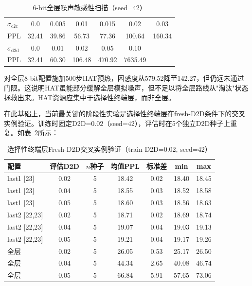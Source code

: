 \begin{table}[htbp]
\centering
\caption{6-bit全层噪声敏感性扫描（seed=42）}
\label{tab:work2_alllayer_sweep}
\begin{tabular}{lcccccc}
\toprule
$\sigma_{\text{c2c}}$ & 0.0 & 0.005 & 0.01 & 0.015 & 0.02 & 0.03 \\
PPL & 32.41 & 39.86 & 56.73 & 77.36 & 100.64 & 160.34 \\
\midrule
$\sigma_{\text{d2d}}$ & 0.0 & 0.01 & 0.02 & 0.05 & 0.10 & \\
PPL & 32.41 & 60.30 & 106.48 & 470.92 & 7635.49 & \\
\bottomrule
\end{tabular}
\end{table}

对全层8-bit配置施加500步HAT预热，困惑度从579.52降至142.27，但仍远未通过门限。这说明HAT虽能部分缓解全层模拟噪声，但不足以将全层路线从"淘汰"状态拯救出来。HAT资源应集中于选择性终端层，而非全层。

在此基础上，当前最关键的阶段性实验是选择性终端层在fresh-D2D条件下的交叉实例验证。训练时固定D2D=0.02（seed=42），评估时在5个独立D2D种子上重复。如表~\ref{tab:work2_fresh_d2d}所示：

\begin{table}[htbp]
\centering
\caption{选择性终端层Fresh-D2D交叉实例验证（train D2D=0.02, seed=42）}
\label{tab:work2_fresh_d2d}
\begin{tabular}{lcccccc}
\toprule
配置 & 评估D2D & $n$种子 & 均值PPL & 标准差 & min & max \\
\midrule
last1 [23] & 0.02 & 5 & 18.42 & 0.02 & 18.40 & 18.45 \\
last1 [23] & 0.04 & 5 & 18.55 & 0.03 & 18.52 & 18.58 \\
last1 [23] & 0.05 & 5 & 18.60 & 0.03 & 18.56 & 18.63 \\
\midrule
last2 [22,23] & 0.02 & 5 & 18.71 & 0.02 & 18.69 & 18.74 \\
last2 [22,23] & 0.04 & 5 & 19.07 & 0.04 & 19.03 & 19.13 \\
last2 [22,23] & 0.05 & 5 & 19.21 & 0.04 & 19.17 & 19.26 \\
\midrule
全层 & 0.02 & 5 & 26.05 & 0.53 & 25.17 & 26.50 \\
全层 & 0.04 & 5 & 44.34 & 2.65 & 40.08 & 46.74 \\
全层 & 0.05 & 5 & 66.84 & 5.91 & 57.65 & 73.06 \\
\bottomrule
\end{tabular}
\end{table}

